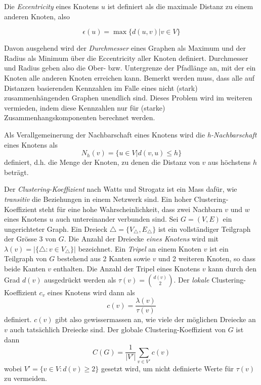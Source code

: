 Die \emph{Eccentricity} eines Knotens $u$ ist definiert als die
maximale Distanz zu einem anderen Knoten, also

\begin{equation}
  \label{eq:3}
  \epsilon(u) = \max\{d(u,v) | v \in V\}
\end{equation}

Davon ausgehend  wird der \emph{Durchmesser} eines Graphen als Maximum
und der Radius als Minimum \"uber die Eccentricity aller Knoten
definiert. Durchmesser und Radius geben also die Ober-
bzw. Untergrenze der Pfadl\"ange an, mit der ein Knoten alle anderen
Knoten erreichen kann. Bemerkt werden muss, dass alle auf Distanzen
basierenden Kennzahlen im Falle eines nicht (stark)
zusammenh\"angenden Graphen unendlich sind. Dieses Problem wird im
weiteren vermieden, indem diese Kennzahlen nur f\"ur (starke)
Zusammenhangskomponenten berechnet werden.

Als Verallgemeinerung der Nachbarschaft eines Knotens wird die
\emph{h-Nachbarschaft} eines Knotens als
\begin{equation}
  \label{eq:4}
  N_h(v) = \{ u \in V | d(v, u) \le h \}
\end{equation}
definiert, d.h. die Menge der Knoten, zu denen die Distanz von $v$ aus
h\"ochstens $h$ betr\"agt.

Der \emph{Clustering-Koeffizient} nach Watts und Strogatz ist ein Mass
daf\"ur, wie \emph{transitiv} die Beziehungen in einem Netzwerk
sind. Ein hoher Clustering-Koeffizient steht f\"ur eine hohe
Wahrscheinlichkeit, dass zwei Nachbarn $v$ und $w$ eines Knotens $u$
auch untereinander verbunden sind. Sei $G = (V, E)$ ein ungerichteter
Graph. Ein Dreieck $\bigtriangleup = \{V_{\bigtriangleup},
E_{\bigtriangleup}\}$ ist ein vollst\"andiger Teilgraph der Gr\"osse 3
von $G$. Die Anzahl der Dreiecke \emph{eines Knotens} wird mit
$\lambda(v) = |\{\bigtriangleup : v \in V_{\bigtriangleup}\}|$
bezeichnet. Ein \emph{Tripel} an einem Knoten $v$ ist ein Teilgraph
von $G$ bestehend aus 2 Kanten sowie $v$ und 2 weiteren Knoten, so
dass beide Kanten $v$ enthalten. Die Anzahl der Tripel eines Knotens
$v$ kann durch den Grad $d(v)$ ausgedr\"uckt werden als
$\tau(v)=\binom{d(v)}{2}$. Der \emph{lokale} Clustering-Koeffizient
$c_v$ eines Knotens wird dann als
\begin{equation}
  \label{eq:5}
  c(v) = \frac{\lambda(v)}{\tau(v)}
\end{equation}
definiert. $c(v)$ gibt also gewissermassen an, wie viele der
m\"oglichen Dreiecke an $v$ auch tats\"achlich Dreiecke sind. Der
globale Clustering-Koeffizient von $G$ ist dann
\begin{equation}
  \label{eq:6}
  C(G) = \frac{1}{|V'|} \sum_{v \in V'}c(v)
\end{equation}
wobei $V' = \{v \in V : d(v) \ge 2\}$ gesetzt wird, um nicht
definierte Werte f\"ur $\tau(v)$ zu vermeiden.

